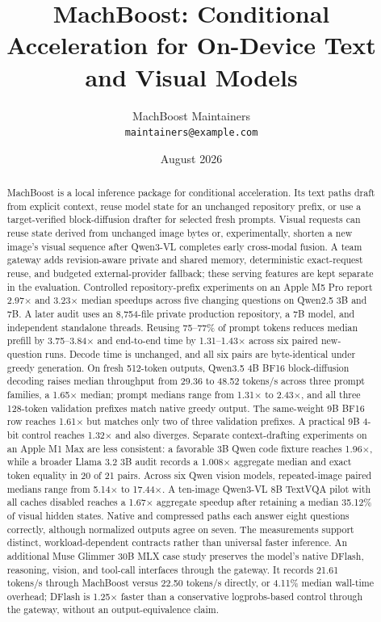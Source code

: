 \documentclass[11pt]{article}
\title{MachBoost: Conditional Acceleration for On-Device Text and Visual Models}
\author{MachBoost Maintainers\\\texttt{maintainers@example.com}}
\date{August 2026}
\begin{document}
\maketitle

\begin{abstract}
MachBoost is a local inference package for conditional acceleration. Its text paths draft from explicit context, reuse model state for an unchanged repository prefix, or use a target-verified block-diffusion drafter for selected fresh prompts. Visual requests can reuse state derived from unchanged image bytes or, experimentally, shorten a new image's visual sequence after Qwen3-VL completes early cross-modal fusion. A team gateway adds revision-aware private and shared memory, deterministic exact-request reuse, and budgeted external-provider fallback; these serving features are kept separate in the evaluation. Controlled repository-prefix experiments on an Apple M5 Pro report 2.97$\times$ and 3.23$\times$ median speedups across five changing questions on Qwen2.5 3B and 7B. A later audit uses an 8,754-file private production repository, a 7B model, and independent standalone threads. Reusing 75--77\% of prompt tokens reduces median prefill by 3.75--3.84$\times$ and end-to-end time by 1.31--1.43$\times$ across six paired new-question runs. Decode time is unchanged, and all six pairs are byte-identical under greedy generation. On fresh 512-token outputs, Qwen3.5 4B BF16 block-diffusion decoding raises median throughput from 29.36 to 48.52 tokens/s across three prompt families, a 1.65$\times$ median; prompt medians range from 1.31$\times$ to 2.43$\times$, and all three 128-token validation prefixes match native greedy output. The same-weight 9B BF16 row reaches 1.61$\times$ but matches only two of three validation prefixes. A practical 9B 4-bit control reaches 1.32$\times$ and also diverges. Separate context-drafting experiments on an Apple M1 Max are less consistent: a favorable 3B Qwen code fixture reaches 1.96$\times$, while a broader Llama 3.2 3B audit records a 1.008$\times$ aggregate median and exact token equality in 20 of 21 pairs. Across six Qwen vision models, repeated-image paired medians range from 5.14$\times$ to 17.44$\times$. A ten-image Qwen3-VL 8B TextVQA pilot with all caches disabled reaches a 1.67$\times$ aggregate speedup after retaining a median 35.12\% of visual hidden states. Native and compressed paths each answer eight questions correctly, although normalized outputs agree on seven. The measurements support distinct, workload-dependent contracts rather than universal faster inference.
An additional Muse Glimmer 30B MLX case study preserves the model's native DFlash, reasoning, vision, and tool-call interfaces through the gateway. It records 21.61 tokens/s through MachBoost versus 22.50 tokens/s directly, or 4.11\% median wall-time overhead; DFlash is 1.25$\times$ faster than a conservative logprobs-based control through the gateway, without an output-equivalence claim.
\end{abstract}
\end{document}

